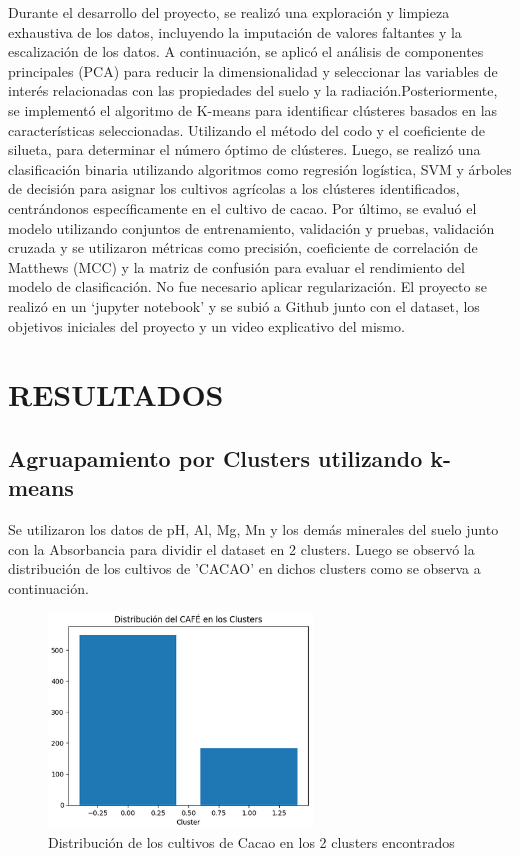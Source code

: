 \documentclass[journal,transmag]{IEEEtran}
\begin{document}
Durante el desarrollo del proyecto, se realizó una exploración y limpieza exhaustiva de los datos, incluyendo la imputación de valores faltantes y la escalización de los datos. A continuación, se aplicó el análisis de componentes principales (PCA) para reducir la dimensionalidad y seleccionar las variables de interés relacionadas con las propiedades del suelo y la radiación.Posteriormente, se implementó el algoritmo de K-means para identificar clústeres basados en las características seleccionadas. Utilizando el método del codo y el coeficiente de silueta, para determinar el número óptimo de clústeres. Luego, se realizó una clasificación binaria utilizando algoritmos como regresión logística, SVM y árboles de decisión para asignar los cultivos agrícolas a los clústeres identificados, centrándonos específicamente en el cultivo de cacao. Por último, se evaluó el modelo utilizando conjuntos de entrenamiento, validación y pruebas, validación cruzada y se utilizaron métricas como precisión, coeficiente de correlación de Matthews (MCC) y la matriz de confusión para evaluar el rendimiento del modelo de clasificación. No fue necesario aplicar regularización.
El proyecto se realizó en un ‘jupyter notebook’ y se subió a Github junto con el dataset, los objetivos iniciales del proyecto y un video explicativo del mismo.
  

\section{RESULTADOS } 
\subsection{Agruapamiento por Clusters utilizando k-means}
Se utilizaron los datos de pH, Al, Mg, Mn y los demás minerales del suelo junto con la Absorbancia para dividir el dataset en 2 clusters. Luego se observó la distribución de los cultivos de 'CACAO' en dichos clusters como se observa a continuación.
\begin{figure}[!h]
    \center
    \includegraphics[width=7cm]{imgs/s1.png}
    \caption{Distribución de los cultivos de Cacao en los 2 clusters encontrados}
    \label{1}
\end{figure}
\end{document}
